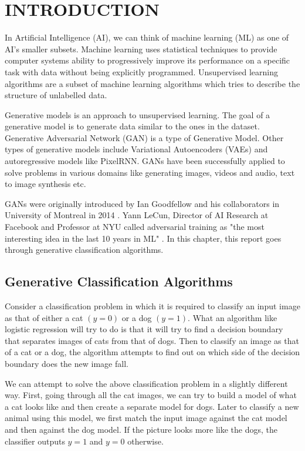 \chapter{INTRODUCTION}
\begin{onehalfspace}
    In Artificial Intelligence (AI), we can think of machine learning (ML) as one 
    of AI's smaller subsets. Machine learning uses statistical techniques to 
    provide computer systems ability to progressively improve its performance on a specific 
    task with data without being explicitly programmed. \cite{Samuel59somestudies} 
    Unsupervised learning algorithms are a subset of machine learning algorithms 
    which tries to describe the structure of unlabelled data. 

    Generative models \cite{openai_genmodels} is an approach to unsupervised 
    learning. The goal of a generative model is to generate data similar to the ones 
    in the dataset. 
    Generative Adversarial Network (GAN) is a type of Generative Model. Other types 
    of generative models include Variational Autoencoders (VAEs) and autoregressive 
    models like PixelRNN. GANs have been successfully applied to solve problems in 
    various domains like generating images, videos and audio, text to image 
    synthesis etc.

    GANs were originally introduced by Ian Goodfellow and his collaborators in 
    University of Montreal in 2014 \cite{gans_basic}.
    Yann LeCun, Director of AI Research at Facebook and Professor at NYU called 
    adversarial training as {"the most interesting idea in the last 10 years 
    in ML"} \cite{yanlecunn_gans}. In this chapter, this report goes through 
    generative classification algorithms.

    \section{Generative Classification Algorithms}
    Consider a classification problem in which it is required to classify an input      
    image as that of either a cat \((y = 0)\) or a dog \((y = 1)\).  What an algorithm 
    like logistic regression will try to do is that it will try to find a 
    decision boundary that separates images of cats from that of dogs. Then to 
    classify an image as that of a cat or a dog, the algorithm attempts to find 
    out on which side of the decision boundary does the new image fall.

    We can attempt to solve the above classification problem in a slightly 
    different way. First, going through all the cat images, we can try to build 
    a model of what a cat looks like and then create a separate model for dogs. 
    Later to classify a new animal using this model, we first match the input 
    image against the cat model and then against the dog model. If the picture 
    looks more like the dogs, the classifier outputs \(y = 1\) and \(y = 0\) otherwise.


\end{onehalfspace}
